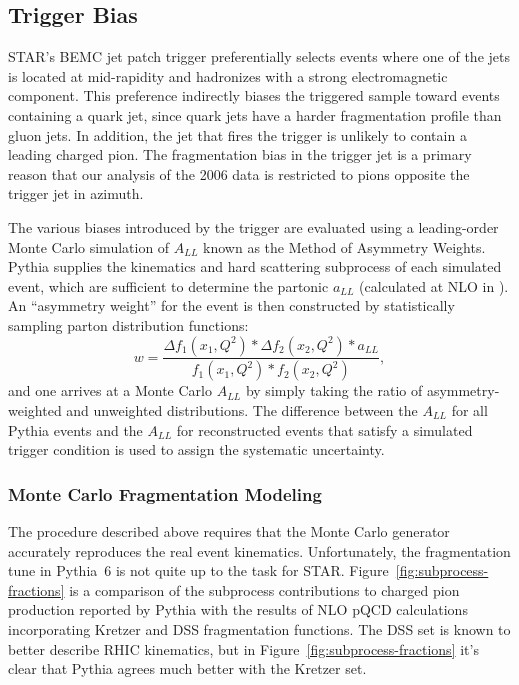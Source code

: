 \subsection{Trigger Bias}

STAR's BEMC jet patch trigger preferentially selects events where one of the jets is located at mid-rapidity and hadronizes with a strong electromagnetic component.  This preference indirectly biases the triggered sample toward events containing a quark jet, since quark jets have a harder fragmentation profile than gluon jets.  In addition, the jet that fires the trigger is unlikely to contain a leading charged pion.  The fragmentation bias in the trigger jet is a primary reason that our analysis of the 2006 data is restricted to pions opposite the trigger jet in azimuth.

The various biases introduced by the trigger are evaluated using a leading-order
Monte Carlo simulation of \(A_{LL}\) known as the Method of Asymmetry Weights.
Pythia supplies the kinematics and hard scattering subprocess of each simulated
event, which are sufficient to determine the partonic \(a_{LL}\) (calculated at
NLO in \cite{}). An ``asymmetry weight'' for the event is then constructed by
statistically sampling parton distribution functions:
%
\begin{equation}
  w = \frac{\Delta f_1(x_1, Q^2) * \Delta f_2(x_2, Q^2) * a_{LL}}{f_1(x_1, Q^2) * f_2(x_2, Q^2)},
\end{equation}
%
and one arrives at a Monte Carlo \(A_{LL}\) by simply taking the ratio of
asymmetry-weighted and unweighted distributions. The difference between the
\(A_{LL}\) for all Pythia events and the \(A_{LL}\) for reconstructed events
that satisfy a simulated trigger condition is used to assign the systematic
uncertainty.

\subsubsection{Monte Carlo Fragmentation Modeling}

The procedure described above requires that the Monte Carlo generator accurately reproduces the real event kinematics. Unfortunately, the fragmentation tune in Pythia~6 is not quite up to the task for STAR. Figure~\ref{fig:subprocess-fractions} is a comparison of the subprocess contributions to charged pion production reported by Pythia with the results of NLO pQCD calculations incorporating Kretzer and DSS fragmentation functions. The DSS set is known to better describe RHIC kinematics, but in Figure~\ref{fig:subprocess-fractions} it's clear that Pythia agrees much better with the Kretzer set.

